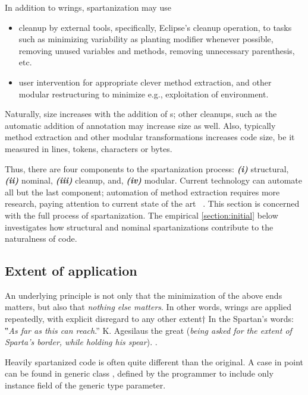 In addition to wrings, spartanization may use
\begin{itemize}
    \item cleanup by external tools, specifically, Eclipse's cleanup operation,
      to tasks such as minimizing variability as planting  modifier
      whenever possible, removing unused variables and methods, removing
      unnecessary parenthesis, etc.
    \item user intervention for appropriate
        clever method extraction, and other modular restructuring to
        minimize e.g., exploitation of environment.
\end{itemize}
Naturally, size increases with the addition of s; other cleanups, such
as the automatic addition of  annotation may increase size as well.
Also, typically method extraction and other modular transformations increases
code size, be it measured in lines, tokens, characters or bytes.

Thus, there are four components to the spartanization process:
\emph{\textbf{(i)}} structural,
\emph{\textbf{(ii)}} nominal,
\emph{\textbf{(iii)}} cleanup, and,
\emph{\textbf{(iv)}} modular.
Current technology can automate all but the last component;
automation of method extraction requires more research,
paying attention to current state of the art \matteo~\cite{%
    we should have many citations
    somewhere can you please add some citations
}.
This section is concerned with the full process of spartanization.
The empirical \cref{section:initial} below investigates how structural and
nominal spartanizations contribute to the naturalness of code.

\subsection{Extent of application}
\label{section:extent}
An underlying principle is not only that the minimization of
the above ends matters, but also that \emph{nothing else matters}.
In other words, wrings are applied repeatedly, with explicit disregard
to any other extent†{%
  In the Spartan's words: ‟\textit{As far as this can reach}.” K. Agesilaus the
  great (\textsl{being asked for the extent of Sparta's border, while
  holding his spear}).
}.

Heavily spartanized code is often quite different than the original. A case in
point can be found in generic class , defined by the programmer to
include only instance field  of the generic type parameter.


